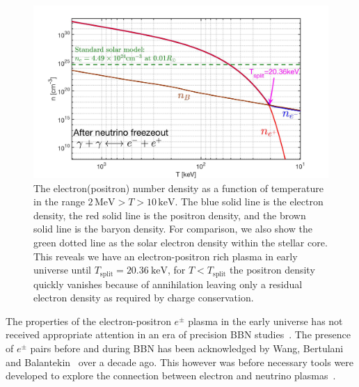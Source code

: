 \documentclass[Universe,article,submit,moreauthors,pdftex]{Definitions/mdpi}
\begin{document}
\begin{figure}[h]
  \centering
  \includegraphics[width=0.75\linewidth]{./plots/NewDensity_cm3.jpg}
  \caption{The electron(positron) number density as a function of temperature in the range $2\,\mathrm{MeV}>T>10\,\mathrm{keV}$. The blue solid line is the electron density, the red solid line is the positron density, and the brown solid line is the baryon density. For comparison, we also show the green dotted line as the solar electron density within the stellar core. This reveals we have an electron-positron rich plasma in early universe until $T_{\mathrm{split}} = 20.36\ \mathrm{keV}$, for $T<T_{\mathrm{split}}$ the positron density quickly vanishes because of annihilation leaving only a residual electron density as required by charge conservation.}
  \label{Density_fig} 
\end{figure}
The properties of the electron-positron $e^{\pm}$ plasma in the early universe has not received appropriate attention in an era of precision BBN studies~\cite{Pitrou:2018cgg}. The presence of $e^{\pm}$ pairs before and during BBN has been acknowledged by Wang, Bertulani and Balantekin~\cite{Wang:2010px} over a decade ago. This however was before necessary tools were developed to explore the connection between electron and neutrino plasmas~\cite{Mangano:2005cc,Birrell:2012gg,Birrell:2014uka}. 
\end{document}
